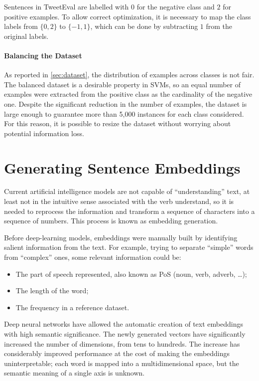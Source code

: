 Sentences in TweetEval are labelled with $0$ for the negative class and $2$ for positive examples. To allow correct optimization, it is necessary to map the class labels from $\{0, 2\}$ to $\{-1, 1\}$, which can be done by subtracting $1$ from the original labels.

\paragraph{Balancing the Dataset} As reported in \ref{sec:dataset}, the distribution of examples across classes is not fair. The balanced dataset is a desirable property in SVMs, so an equal number of examples were extracted from the positive class as the cardinality of the negative one. Despite the significant reduction in the number of examples, the dataset is large enough to guarantee more than 5,000 instances for each class considered. For this reason, it is possible to resize the dataset without worrying about potential information loss.

\section{Generating Sentence Embeddings}

Current artificial intelligence models are not capable of ``understanding'' text, at least not in the intuitive sense associated with the verb understand, so it is needed to reprocess the information and transform a sequence of characters into a sequence of numbers. This process is known as embedding generation.

Before deep-learning models, embeddings were manually built by identifying salient information from the text. For example, trying to separate ``simple'' words from ``complex'' ones, some relevant information could be:
\begin{itemize}
    \item The part of speech represented, also known as PoS (noun, verb, adverb, \dots);
    \item The length of the word;
    \item The frequency in a reference dataset.
\end{itemize}

Deep neural networks have allowed the automatic creation of text embeddings with high semantic significance\cite{word2vec}. The newly generated vectors have significantly increased the number of dimensions, from tens to hundreds. The increase has considerably improved performance at the cost of making the embeddings uninterpretable; each word is mapped into a multidimensional space, but the semantic meaning of a single axis is unknown.

